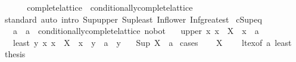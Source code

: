 \begin{isabellebody}
\endisatagproof
{\isafoldproof}%
%
\isadelimproof
\isanewline
%
\endisadelimproof
\ \ \isanewline
\ \ \isamarkupfalse%
\isanewline
\isanewline
{}\isamarkupfalse%
\isanewline
\isanewline
{}\isamarkupfalse%
\ complete{\isacharunderscore}{\kern0pt}lattice\ {\isasymsubseteq}\ conditionally{\isacharunderscore}{\kern0pt}complete{\isacharunderscore}{\kern0pt}lattice\isanewline
%
\isadelimproof
\ \ %
\endisadelimproof
%
\isatagproof
{}\isamarkupfalse%
\ standard\ {\isacharparenleft}{\kern0pt}auto\ intro{\isacharcolon}{\kern0pt}\ Sup{\isacharunderscore}{\kern0pt}upper\ Sup{\isacharunderscore}{\kern0pt}least\ Inf{\isacharunderscore}{\kern0pt}lower\ Inf{\isacharunderscore}{\kern0pt}greatest{\isacharparenright}{\kern0pt}%
\endisatagproof
{\isafoldproof}%
%
\isadelimproof
\isanewline
%
\endisadelimproof
\isanewline
{}\isamarkupfalse%
\ cSup{\isacharunderscore}{\kern0pt}eq{\isacharcolon}{\kern0pt}\isanewline
\ \ \ a\ {\isacharcolon}{\kern0pt}{\isacharcolon}{\kern0pt}\ {\isachardoublequoteopen}{\isacharprime}{\kern0pt}a\ {\isacharcolon}{\kern0pt}{\isacharcolon}{\kern0pt}\ {\isacharbraceleft}{\kern0pt}conditionally{\isacharunderscore}{\kern0pt}complete{\isacharunderscore}{\kern0pt}lattice{\isacharcomma}{\kern0pt}\ no{\isacharunderscore}{\kern0pt}bot{\isacharbraceright}{\kern0pt}{\isachardoublequoteclose}\isanewline
\ \ \ upper{\isacharcolon}{\kern0pt}\ {\isachardoublequoteopen}{\isasymAnd}x{\isachardot}{\kern0pt}\ x\ {\isasymin}\ X\ {\isasymLongrightarrow}\ x\ {\isasymle}\ a{\isachardoublequoteclose}\isanewline
\ \ \ least{\isacharcolon}{\kern0pt}\ {\isachardoublequoteopen}{\isasymAnd}y{\isachardot}{\kern0pt}\ {\isacharparenleft}{\kern0pt}{\isasymAnd}x{\isachardot}{\kern0pt}\ x\ {\isasymin}\ X\ {\isasymLongrightarrow}\ x\ {\isasymle}\ y{\isacharparenright}{\kern0pt}\ {\isasymLongrightarrow}\ a\ {\isasymle}\ y{\isachardoublequoteclose}\isanewline
\ \ \ {\isachardoublequoteopen}Sup\ X\ {\isacharequal}{\kern0pt}\ a{\isachardoublequoteclose}\isanewline
%
\isadelimproof
%
\endisadelimproof
%
\isatagproof
{}\isamarkupfalse%
\ cases\isanewline
\ \ \isamarkupfalse%
\ {\isachardoublequoteopen}X\ {\isacharequal}{\kern0pt}\ {\isacharbraceleft}{\kern0pt}{\isacharbraceright}{\kern0pt}{\isachardoublequoteclose}\ \isamarkupfalse%
\ lt{\isacharunderscore}{\kern0pt}ex{\isacharbrackleft}{\kern0pt}of\ a{\isacharbrackright}{\kern0pt}\ least\ \isamarkupfalse%
\ {\isacharquery}{\kern0pt}thesis\ \isamarkupfalse%

\end{isabellebody}
